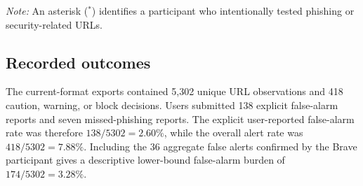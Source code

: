 \begin{table}[htbp]
\centering
\caption{Participant-level browser user-evaluation results.}
\label{tab:browser-user-participants}
\scriptsize
{}
\par\vspace{1.5mm}
\begin{minipage}{\textwidth}
\footnotesize\textit{Note:} An asterisk ($^{*}$) identifies a participant who
intentionally tested phishing or security-related URLs.
\end{minipage}
\end{table}

\subsection{Recorded outcomes}

The current-format exports contained 5,302 unique URL observations and 418
caution, warning, or block decisions. Users submitted 138 explicit
false-alarm reports and seven missed-phishing reports. The explicit
user-reported false-alarm rate was therefore $138/5302=2.60\%$, while the
overall alert rate was $418/5302=7.88\%$. Including the 36 aggregate false
alerts confirmed by the Brave participant gives a descriptive lower-bound
false-alarm burden of $174/5302=3.28\%$.

